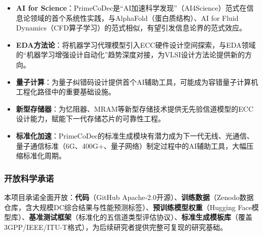 \begin{itemize}[nosep,leftmargin=1.5em]
  \item \textbf{AI for Science}：PrimeCoDec是``AI加速科学发现''（AI4Science）范式在信息论领域的首个系统性实践，与AlphaFold（蛋白质结构）、AI for Fluid Dynamics（CFD算子学习）的范式相似，有望引发信息论界的范式效应。
  \item \textbf{EDA方法论}：将机器学习代理模型引入ECC硬件设计空间探索，与EDA领域的``机器学习增强设计自动化''趋势深度对接，为VLSI设计方法论提供新的方向。
  \item \textbf{量子计算}：为量子纠错码设计提供首个AI辅助工具，可能成为容错量子计算机工程化路径中的重要基础设施。
  \item \textbf{新型存储器}：为忆阻器、MRAM等新型存储技术提供无先验信道模型的ECC设计能力，赋能下一代存储芯片的可靠性工程。
  \item \textbf{标准化加速}：PrimeCoDec的标准生成模块有潜力成为下一代无线、光通信、量子通信标准（6G、400G+、量子网络）制定过程中的AI辅助工具，大幅压缩标准化周期。
\end{itemize}

\subsubsection{开放科学承诺}

本项目承诺全面开放：\textbf{代码}（GitHub Apache-2.0开源）、\textbf{训练数据}（Zenodo数据仓库，含大规模DC综合结果与性能预测标签）、\textbf{预训练模型权重}（Hugging Face模型库）、\textbf{基准测试框架}（标准化的五信道类型评估协议）、\textbf{标准生成模板库}（覆盖3GPP/IEEE/ITU-T格式），为后续研究者提供完整可复现的研究基础。
